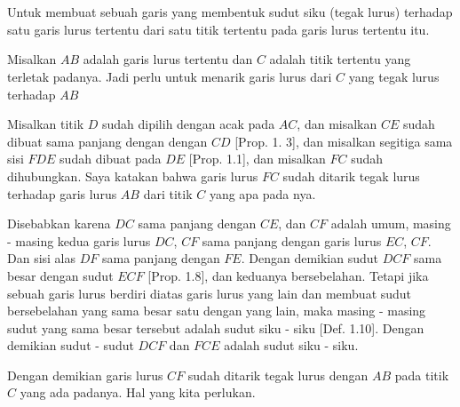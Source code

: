 \documentclass[a4paper]{book}
\begin{document}
\section*{\centering \thesection} 
Untuk membuat sebuah garis yang membentuk sudut siku (tegak lurus) terhadap satu
garis lurus tertentu dari satu titik tertentu pada garis lurus tertentu itu.
\begin{center}
\end{center}

Misalkan $AB$ adalah garis lurus tertentu dan $C$ adalah titik tertentu yang
terletak padanya. Jadi perlu untuk menarik garis lurus dari $C$ yang tegak
lurus terhadap $AB$

Misalkan titik $D$ sudah dipilih dengan acak pada $AC$, dan misalkan $CE$ 
sudah dibuat sama panjang dengan dengan $CD$ [Prop. 1. 3], dan misalkan
segitiga sama sisi $FDE$ sudah dibuat pada $DE$ [Prop. 1.1], dan misalkan
$FC$ sudah dihubungkan. Saya katakan bahwa garis lurus $FC$ sudah ditarik
tegak lurus terhadap garis lurus $AB$ dari titik $C$ yang apa pada nya.

Disebabkan karena $DC$ sama panjang dengan $CE$, dan $CF$ adalah umum, 
masing - masing kedua garis lurus $DC$, $CF$ sama panjang dengan garis lurus
$EC$, $CF$. Dan sisi alas $DF$ sama panjang dengan $FE$. Dengan demikian
sudut $DCF$ sama besar dengan sudut $ECF$ [Prop. 1.8], dan keduanya 
bersebelahan. Tetapi jika sebuah garis lurus berdiri diatas garis lurus
yang lain dan membuat sudut bersebelahan yang sama besar satu dengan yang
lain, maka masing - masing sudut yang sama besar tersebut adalah sudut
siku - siku [Def. 1.10]. Dengan demikian sudut - sudut
$DCF$ dan $FCE$ adalah sudut siku - siku.

Dengan demikian garis lurus $CF$ sudah ditarik tegak lurus dengan
$AB$ pada titik $C$ yang ada padanya. Hal yang kita perlukan.


\end{document}

